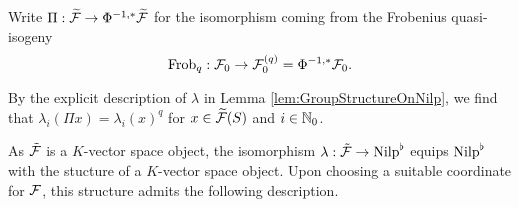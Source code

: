 \documentclass[../main.tex]{subfiles}
\begin{document}
\begin{defi} \label{def:FrobOnUnivCov}
  Write $\Pi: \widetilde{\mathcal{F}} \to \Phi^{-1,*}\widetilde{\mathcal{F}}$ for the isomorphism coming from
  the Frobenius quasi-isogeny 
  \begin{equation*}
    \mathrm{Frob}_q: \mathcal{F}_0 \to \mathcal{F}_0^{(q)} = \Phi^{-1,*} \mathcal{F}_0.
  \end{equation*}
\end{defi}

By the explicit description of $\lambda$ in Lemma
\ref{lem:GroupStructureOnNilp}, we find that $\lambda_i(\Pi x) =
\lambda_i(x)^q$ for $x \in \widetilde{\mathcal{F}}(S)$ and $i\in \mathbb{N}_0$. 

As $\tilde {\mathcal{F}}$ is a $K$-vector space
object, the isomorphism $\lambda: \tilde {\mathcal{F}} \to {\mathrm{Nilp}}^\flat$ equips
${\mathrm{Nilp}}^\flat$ with the stucture of a $K$-vector space object. Upon choosing a 
suitable coordinate for $\mathcal{F}$, this structure admits the following description.
\end{document}
